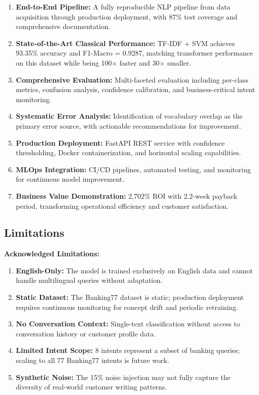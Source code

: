 \documentclass[12pt,a4paper]{article}
\begin{document}
\begin{enumerate}[leftmargin=*]
    \item \textbf{End-to-End Pipeline:} A fully reproducible NLP pipeline from data acquisition through production deployment, with 87\% test coverage and comprehensive documentation.

    \item \textbf{State-of-the-Art Classical Performance:} TF-IDF + SVM achieves 93.35\% accuracy and F1-Macro = 0.9287, matching transformer performance on this dataset while being 100$\times$ faster and 30$\times$ smaller.

    \item \textbf{Comprehensive Evaluation:} Multi-faceted evaluation including per-class metrics, confusion analysis, confidence calibration, and business-critical intent monitoring.

    \item \textbf{Systematic Error Analysis:} Identification of vocabulary overlap as the primary error source, with actionable recommendations for improvement.

    \item \textbf{Production Deployment:} FastAPI REST service with confidence thresholding, Docker containerization, and horizontal scaling capabilities.

    \item \textbf{MLOps Integration:} CI/CD pipelines, automated testing, and monitoring for continuous model improvement.

    \item \textbf{Business Value Demonstration:} 2,702\% ROI with 2.2-week payback period, transforming operational efficiency and customer satisfaction.
\end{enumerate}

\subsection{Limitations}
\label{subsec:limitations}

\begin{warnbox}
\textbf{Acknowledged Limitations:}
\begin{enumerate}[leftmargin=*]
    \item \textbf{English-Only:} The model is trained exclusively on English data and cannot handle multilingual queries without adaptation.
    \item \textbf{Static Dataset:} The Banking77 dataset is static; production deployment requires continuous monitoring for concept drift and periodic retraining.
    \item \textbf{No Conversation Context:} Single-text classification without access to conversation history or customer profile data.
    \item \textbf{Limited Intent Scope:} 8 intents represent a subset of banking queries; scaling to all 77 Banking77 intents is future work.
    \item \textbf{Synthetic Noise:} The 15\% noise injection may not fully capture the diversity of real-world customer writing patterns.
\end{enumerate}
\end{warnbox}
\end{document}
